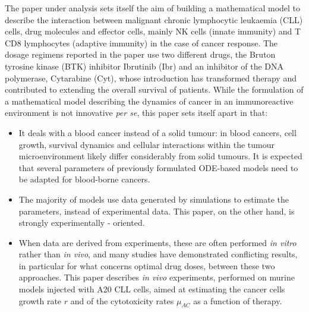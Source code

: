 The paper under analysis sets itself the aim of building a mathematical model to describe the interaction between malignant chronic lymphocytic leukaemia (CLL) cells, drug molecules and effector cells, mainly NK cells (innate immunity) and T CD8 lymphocytes (adaptive immunity) in the case of cancer response.
The dosage regimens reported in the paper use two different drugs, the Bruton tyrosine kinase (BTK) inhibitor Ibrutinib (Ibr) and an inhibitor of the DNA polymerase, Cytarabine (Cyt), whose introduction has transformed therapy and contributed to extending the overall survival of patients. 
While the formulation of a mathematical model describing the dynamics of cancer in an immunoreactive environment is not innovative \textit{per se}, this paper sets itself apart in that:
\begin{itemize}
\item It deals with a blood cancer instead of a solid tumour: in blood cancers, cell growth, survival dynamics and cellular interactions within the tumour microenvironment likely differ considerably from solid tumours. It is expected that several parameters of previously formulated ODE-based models need to be adapted for blood-borne cancers.
\item The majority of models use data generated by simulations to estimate the parameters, instead of experimental data. This paper, on the other hand, is strongly experimentally - oriented.
\item When data are derived from experiments, these are often performed \textit{in vitro} rather than \textit{in vivo}, and many studies have demonstrated conflicting results, in particular for what concerns optimal drug doses, between these two approaches. This paper describes \textit{in vivo} experiments, performed on murine models injected with A20 CLL cells, aimed at estimating the cancer cells growth rate $r$ and of the cytotoxicity rates $\mu_{AC}$ as a function of therapy. \par
\end{itemize}

